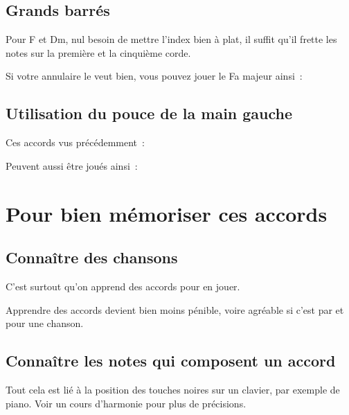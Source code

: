 \documentclass[11pt]{article}
\begin{document}

\subsection{Grands barrés}



Pour F et Dm, nul besoin de mettre l’index bien à plat, il suffit qu’il
frette les notes sur la première et la cinquième corde.

Si votre annulaire le veut bien, vous pouvez jouer le Fa majeur ainsi~:


\subsection{Utilisation du pouce de la main gauche}

Ces accords vus précédemment~:


Peuvent aussi être joués ainsi~:


\section{Pour bien mémoriser ces accords}

\subsection{Connaître des chansons}

C’est surtout qu’on apprend des accords pour en jouer.

Apprendre des accords devient bien moins pénible, voire agréable si c’est
par et pour une chanson.

\subsection{Connaître les notes qui composent un accord}

Tout cela est lié à la position des touches noires sur un clavier, par exemple
de piano. Voir un cours d’harmonie pour plus de précisions.
\end{document}

